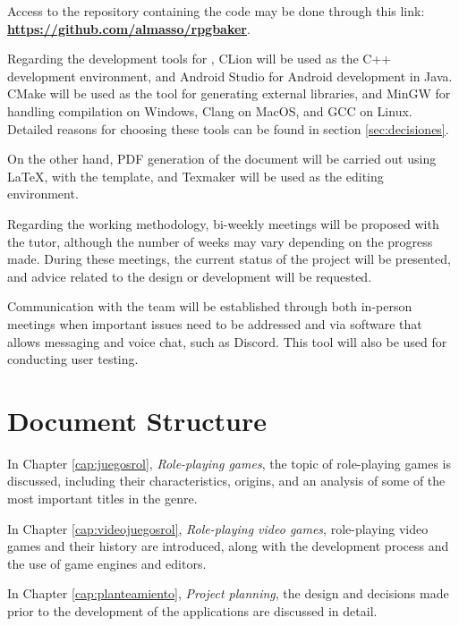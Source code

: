 \smallskip

Access to the repository containing the code may be done through this link: \href{https://github.com/almasso/rpgbaker}{\textbf{https://github.com/almasso/rpgbaker}}.

\medskip

Regarding the development tools for \baker, CLion will be used as the C++ development environment, and Android Studio for Android development in Java. CMake will be used as the tool for generating external libraries, and MinGW for handling compilation on Windows, Clang on MacOS, and GCC on Linux. Detailed reasons for choosing these tools can be found in section \ref{sec:decisiones}.

\medskip

On the other hand, PDF generation of the document will be carried out using \LaTeX, with the \texis{} template, and Texmaker will be used as the editing environment.

\bigskip

Regarding the working methodology, bi-weekly meetings will be proposed with the tutor, although the number of weeks may vary depending on the progress made. During these meetings, the current status of the project will be presented, and advice related to the design or development will be requested.

\medskip

Communication with the team will be established through both in-person meetings when important issues need to be addressed and via software that allows messaging and voice chat, such as Discord. This tool will also be used for conducting user testing.

\section*{Document Structure} 
In Chapter \ref{cap:juegosrol}, \textit{Role-playing games}, the topic of role-playing games is discussed, including their characteristics, origins, and an analysis of some of the most important titles in the genre.

\medskip

In Chapter \ref{cap:videojuegosrol}, \textit{Role-playing video games}, role-playing video games and their history are introduced, along with the development process and the use of game engines and editors.

\medskip

In Chapter \ref{cap:planteamiento}, \textit{Project planning}, the design and decisions made prior to the development of the applications are discussed in detail.

